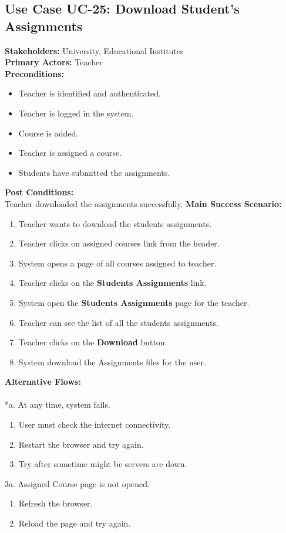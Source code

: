\subsection{Use Case UC-25: Download Student's Assignments}
\textbf{Stakeholders: } University, Educational Institutes \\
\textbf{Primary Actors: } Teacher \\
\textbf{Preconditions:}
\begin{itemize}
\item Teacher is identified and authenticated.
\item Teacher is logged in the system.
\item Course is added.
\item Teacher is assigned a course.
\item Students have submitted the assignments.
\end{itemize}
\textbf{Post Conditions: }\\
Teacher downloaded the assignments successfully.
\textbf{Main Success Scenario:}
\begin{enumerate}
\item Teacher wants to download the students assignments.
\item Teacher clicks on assigned courses link from the header.
\item System opens a page of all courses assigned to teacher.
\item Teacher clicks on the \textbf{Students Assignments} link.
\item System open the \textbf{Students Assignments} page for the teacher.
\item Teacher can see the list of all the students assignments.
\item Teacher clicks on the \textbf{Download} button.
\item System download the Assignments files for the user.
\end{enumerate}
\textbf{Alternative Flows:}\\
\\
*a. At any time, system fails.
\begin{enumerate}
\item User must check the internet connectivity.
\item Restart the browser and try again.
\item Try after sometime might be servers are down.
\end{enumerate}
3a. Assigned Course page is not opened.
\begin{enumerate}
\item Refresh the browser.
\item Reload the page and try again.
\end{enumerate}
